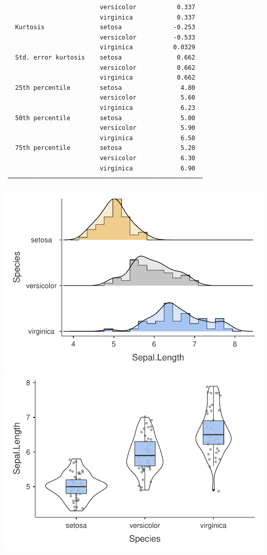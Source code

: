\documentclass[]{article}
\begin{document}
\begin{verbatim}
                          versicolor           0.337   
                          virginica            0.337   
   Kurtosis               setosa              -0.253   
                          versicolor          -0.533   
                          virginica           0.0329   
   Std. error kurtosis    setosa               0.662   
                          versicolor           0.662   
                          virginica            0.662   
   25th percentile        setosa                4.80   
                          versicolor            5.60   
                          virginica             6.23   
   50th percentile        setosa                5.00   
                          versicolor            5.90   
                          virginica             6.50   
   75th percentile        setosa                5.20   
                          versicolor            6.30   
                          virginica             6.90   
 ───────────────────────────────────────────────────── 
\end{verbatim}

\includegraphics{R-Giris_files/figure-latex/descriptive-1.pdf}
\includegraphics{R-Giris_files/figure-latex/descriptive-2.pdf}
\end{document}
